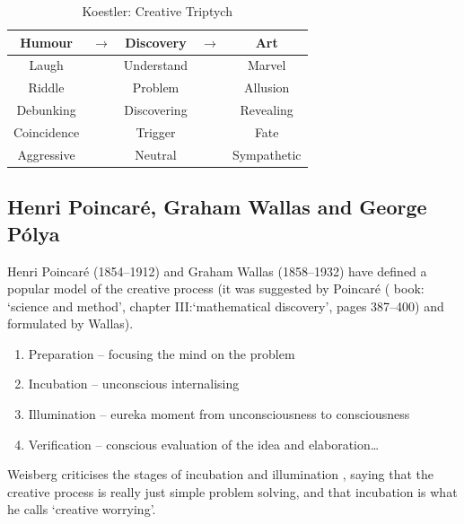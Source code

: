 \begin{table}[!htbp]
\caption[Creative Triptych]{Koestler: Creative Triptych}
\label{KHDA}
  \centering
  \begin{tabu}{ccccc}
  \toprule
  \textbf{Humour} & $\to$ & \textbf{Discovery} & $\to$ & \textbf{Art} \\
  \midrule
  Laugh           && Understand         && Marvel       \\
  Riddle          && Problem            && Allusion     \\
  Debunking       && Discovering        && Revealing    \\
  Coincidence     && Trigger            && Fate         \\
  Aggressive      && Neutral            && Sympathetic  \\
  \bottomrule
  \end{tabu}
\end{table}


\subsection*{Henri Poincaré, Graham Wallas and George Pólya}

Henri Poincaré (1854--1912) \autocite{Poincare2001} and Graham Wallas (1858--1932) \autocite{Wallas1926} have defined a popular model \autocite{Boden2003, Koestler1964, Partridge1994} of the creative process (it was suggested by Poincaré  (\autocite{Poincare2001} book: `science and method', chapter III:\@`mathematical discovery', pages 387--400) and formulated by Wallas).


\begin{enumerate}
  \item Preparation – focusing the mind on the problem
  \item Incubation – unconscious internalising
  \item Illumination – eureka moment from unconsciousness to consciousness
  \item Verification – conscious evaluation of the idea and elaboration…
\end{enumerate}

Weisberg criticises the stages of incubation and illumination \autocite[referred to by][]{Partridge1994}, saying that the creative process is really just simple problem solving, and that incubation is what he calls `creative worrying'.

